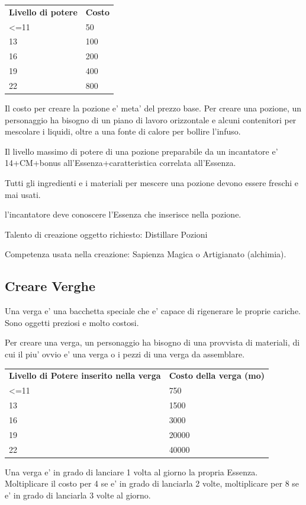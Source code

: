\documentclass[a4paper,11pt,twoside,openany]{book}
\begin{document}
{\bigskip

\begin{tabular}{ll}
\toprule
\textbf{Livello di potere} & \textbf{Costo}\tabularnewline
\textless=11 & 50\tabularnewline
13 & 100\tabularnewline
16 & 200\tabularnewline
19 & 400\tabularnewline
22 & 800\tabularnewline
\end{tabular}

\bigskip

Il costo per creare la pozione e' meta' del prezzo base. Per creare una pozione, un personaggio ha bisogno di un piano di lavoro orizzontale e alcuni contenitori per mescolare i liquidi, oltre a una fonte di calore per bollire l'infuso.

Il livello massimo di potere di una pozione preparabile da un incantatore e' 14+CM+bonus all'Essenza+caratteristica correlata all'Essenza.

Tutti gli ingredienti e i materiali per mescere una pozione devono essere freschi e mai usati.

l'incantatore deve conoscere l'Essenza che inserisce nella pozione.

Talento di creazione oggetto richiesto: Distillare Pozioni

Competenza usata nella creazione: Sapienza Magica o Artigianato (alchimia).

\subsection{Creare Verghe}

Una verga e' una bacchetta speciale che e' capace di rigenerare le proprie cariche. Sono oggetti preziosi e molto costosi.

Per creare una verga, un personaggio ha bisogno di una provvista di materiali, di cui il piu' ovvio e' una verga o i pezzi di una verga da assemblare.

\medskip

\begin{tabular}{ll}
\toprule
\textbf{Livello di Potere inserito nella verga} & \textbf{Costo della verga (mo)}\tabularnewline
\textless=11 & 750\tabularnewline
13 & 1500\tabularnewline
16 & 3000\tabularnewline
19 & 20000\tabularnewline
22 & 40000\tabularnewline
\end{tabular}

\bigskip

Una verga e' in grado di lanciare 1 volta al giorno la propria Essenza. Moltiplicare il costo per 4 se e' in grado di lanciarla 2 volte, moltiplicare per 8 se e' in grado di lanciarla 3 volte al giorno. 

}
\end{document}

